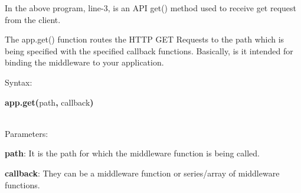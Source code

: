 \documentclass[
]{article}
\begin{document}
In the above program, line-3, is an API get() method used to receive get
request from the client.

\hfill    

The app.get() function routes the HTTP GET Requests to the path which is
being specified with the specified callback functions. Basically, is it
intended for binding the middleware to your application.

\hfill    

{Syntax:}

\textbf{app.get(}path\textbf{,} callback\textbf{)}

\textbf{}\strut \\

{Parameters:}

\textbf{path}: It is the path for which the middleware function is being
called.

\textbf{callback}: They can be a middleware function or series/array of
middleware functions.
\end{document}
